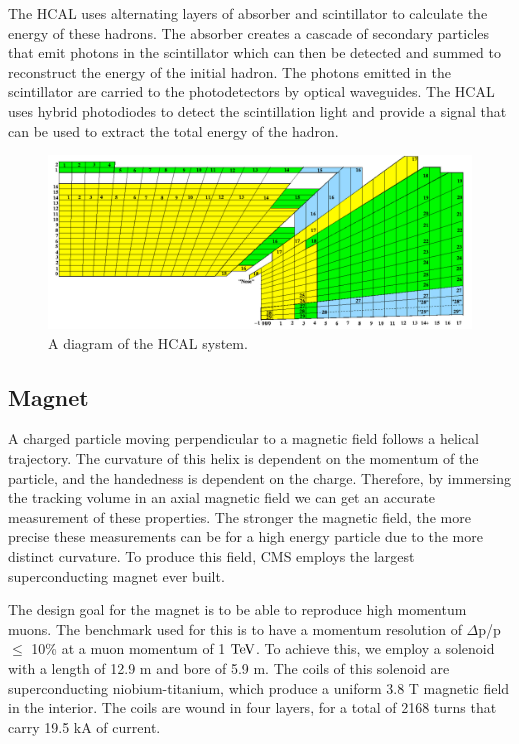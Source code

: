 The HCAL uses alternating layers of absorber and scintillator to calculate the energy of these hadrons.  
The absorber creates a cascade of secondary particles that emit photons in the scintillator which can then be detected and summed to reconstruct the energy of the initial hadron.  
The photons emitted in the scintillator are carried to the photodetectors by optical waveguides.  
The HCAL uses hybrid photodiodes to detect the scintillation light and provide a signal that can be used to extract the total energy of the hadron.  

\begin{figure}
\begin{center}
\includegraphics[width=1.0\linewidth]{figs/CMShcal.png}
\caption{A diagram of the HCAL system.}
\label{figs:CMShcal}
\end{center}
\end{figure}
  
\subsection{Magnet}
A charged particle moving perpendicular to a magnetic field follows a helical trajectory.  
The curvature of this helix is dependent on the momentum of the particle, and the handedness is dependent on the charge.  
Therefore, by immersing the tracking volume in an axial magnetic field we can get an accurate measurement of these properties.  
The stronger the magnetic field, the more precise these measurements can be for a high energy particle due to the more distinct curvature.  
To produce this field, CMS employs the largest superconducting magnet ever built.  

The design goal for the magnet is to be able to reproduce high momentum muons.  
The benchmark used for this is to have a momentum resolution of $\Delta$p/p $\leq$ 10\% at a muon momentum of 1 $\mathrm{TeV}$.  
To achieve this, we employ a solenoid with a length of 12.9 m and bore of 5.9 m.  
The coils of this solenoid are superconducting niobium-titanium, which produce a uniform 3.8 T magnetic field in the interior. 
The coils are wound in four layers, for a total of 2168 turns that carry 19.5 kA of current.    

